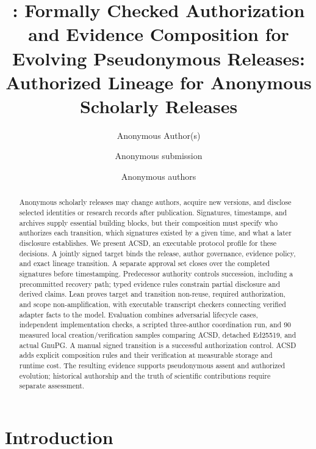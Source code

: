 \documentclass[acmsmall,screen,review,nonacm]{acmart}
\title{\acsd: Formally Checked Authorization and Evidence Composition for Evolving Pseudonymous Releases}
\title{\acsd: Authorized Lineage for Anonymous Scholarly Releases}
\author{Anonymous Author(s)}
\author{Anonymous submission}
\author{Anonymous authors}
\date{}
\newcommand{\acsd}{\textsc{ACSD}}
\begin{document}
\ifdefined\ACSDTOPS\else
  \maketitle
\fi

\begin{abstract}
Anonymous scholarly releases may change authors, acquire new versions, and
disclose selected identities or research records after publication. Signatures,
timestamps, and archives supply essential building blocks, but their composition
must specify who authorizes each transition, which signatures existed by a
given time, and what a later disclosure establishes. We present \acsd, an
executable protocol profile for these decisions. A jointly signed target binds
the release, author governance, evidence policy, and exact lineage transition.
A separate approval set closes over the completed signatures before timestamping.
Predecessor authority controls succession, including a precommitted recovery
path; typed evidence rules constrain partial disclosure and derived claims.
Lean proves target and transition non-reuse, required authorization, and scope
non-amplification, with executable transcript checkers connecting verified
adapter facts to the model. Evaluation combines adversarial lifecycle cases,
independent implementation checks, a scripted three-author coordination run,
and 90 measured local creation/verification samples comparing ACSD, detached
Ed25519, and actual GnuPG. A manual signed
transition is a successful authorization control. ACSD adds explicit composition
rules and their verification at measurable storage and runtime cost.
The resulting evidence supports pseudonymous assent and authorized evolution;
historical authorship and the truth of scientific contributions require
separate assessment.
\end{abstract}

\ifdefined\ACSDTOPS
{}
\maketitle
\fi

\section{Introduction}
\end{document}
